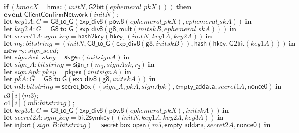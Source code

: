 \documentclass{article}
\newcommand{\cinput}[2]{{#1}({#2})}
\newcommand{\coutput}[2]{\overline{#1}\langle{#2}\rangle}
\newcommand{\kw}[1]{\mathbf{#1}}
\newcommand{\kwf}[1]{\mathsf{#1}}
\newcommand{\var}[1]{\mathit{#1}}
\newcommand{\kwt}[1]{\mathit{#1}}
\newcommand{\kwc}[1]{\mathit{#1}}
\begin{document}
\begin{tabbing}
\>$\quad \kw{if}\ (\var{hmacX}  =  \kwf{hmac}(\var{initN}, \kwf{G2bit}(\var{ephemeral{\_}pkX})))\ \kw{then}$\\
\>$\quad \kw{event}\ \kwf{ClientConfirmNetwork}(\var{initN});$\\
\>$\quad \kw{let}\ \var{key1A}: \kwt{G} = \kwf{G8{\_}to{\_}G}(\kwf{exp{\_}div8}(\kwf{pow8}(\var{ephemeral{\_}pkX}), \var{ephemeral{\_}skA}))\ \kw{in}$\\
\>$\quad \kw{let}\ \var{key2A}: \kwt{G} = \kwf{G8{\_}to{\_}G}(\kwf{exp{\_}div8}(\kwf{g8}, \kwf{mult}(\var{initskB}, \var{ephemeral{\_}skA})))\ \kw{in}$\\
\>$\quad \kw{let}\ \var{secret1A}: \kwt{sym{\_}key} = \kwf{hash2key}(\kwf{hkey}, \kwf{}(\var{initN}, \var{key1A}, \var{key2A}))\ \kw{in}$\\
\>$\quad \kw{let}\ \var{m}_{3}: \kwt{bitstring} = \kwf{}(\var{initN}, \kwf{G8{\_}to{\_}G}(\kwf{exp{\_}div8}(\kwf{g8}, \var{initskB})), \kwf{hash}(\kwf{hkey}, \kwf{G2bit}(\var{key1A})))\ \kw{in}$\\
\>$\quad \kw{new}\ \var{r}_{2}: \kwt{sign{\_}seed};$\\
\>$\quad \kw{let}\ \var{signAsk}: \kwt{skey} = \kwf{skgen}(\var{initsignA})\ \kw{in}$\\
\>$\quad \kw{let}\ \var{sign{\_}A}: \kwt{bitstring} = \kwf{sign{\_}r}(\var{m}_{3}, \var{signAsk}, \var{r}_{2})\ \kw{in}$\\
\>$\quad \kw{let}\ \var{signApk}: \kwt{pkey} = \kwf{pkgen}(\var{initsignA})\ \kw{in}$\\
\>$\quad \kw{let}\ \var{pkA}: \kwt{G} = \kwf{G8{\_}to{\_}G}(\kwf{exp{\_}div8}(\kwf{g8}, \var{initskA}))\ \kw{in}$\\
\>$\quad \kw{let}\ \var{m3}: \kwt{bitstring} = \kwf{secret{\_}box}(\kwf{}(\var{sign{\_}A}, \var{pkA}, \var{signApk}), \kwf{empty{\_}addata}, \var{secret1A}, \kwf{nonce0})\ \kw{in}$\\
\>$\quad \coutput{\kwc{c3}[\var{i}]}{\var{m3}};$\\
\>$\quad \cinput{\kwc{c4}[\var{i}]}{\var{m5}: \kwt{bitstring}};$\\
\>$\quad \kw{let}\ \var{key3A}: \kwt{G} = \kwf{G8{\_}to{\_}G}(\kwf{exp{\_}div8}(\kwf{pow8}(\var{ephemeral{\_}pkX}), \var{initskA}))\ \kw{in}$\\
\>$\quad \kw{let}\ \var{secret2A}: \kwt{sym{\_}key} = \kwf{bit2symkey}(\kwf{}(\var{initN}, \var{key1A}, \var{key2A}, \var{key3A}))\ \kw{in}$\\
\>$\quad \kw{let}\ \kwf{injbot}(\var{sign{\_}B}: \kwt{bitstring}) = \kwf{secret{\_}box{\_}open}(\var{m5}, \kwf{empty{\_}addata}, \var{secret2A}, \kwf{nonce0})\ \kw{in}$\\

\end{tabbing}
\end{document}
